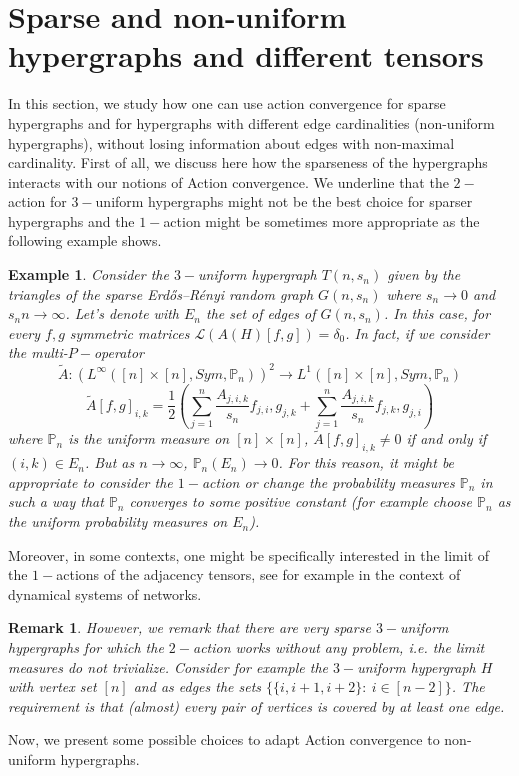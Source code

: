 \documentclass[11pt]{article}
\newtheorem{example}[theorem]{Example}
\newtheorem{remark}[theorem]{Remark}
\begin{document}
\section{Sparse and non-uniform hypergraphs and different tensors}\label{NonUnifHypSect}
In this section, we study how one can use action convergence for sparse hypergraphs and for hypergraphs with different edge cardinalities (non-uniform hypergraphs), without losing information about edges with non-maximal cardinality. %
First of all, we discuss here how the sparseness of the hypergraphs interacts with our notions of Action convergence.
We underline that the $2-$action for $3-$uniform hypergraphs might not be the best choice for sparser hypergraphs and the $1-$action might be sometimes more appropriate as the following example shows.

\begin{example}
Consider the $3-$uniform hypergraph $T(n,s_n)$ given by the triangles of the sparse Erdős–Rényi random graph $G(n,s_n)$ where $s_n \rightarrow 0 $ and $s_n n\rightarrow \infty$. Let's denote with $E_n$ the set of edges of $G(n,s_n)$. In this case, for every $f,g$ symmetric matrices $\mathcal{L}(A(H)[f,g])=\delta_0$.  In fact, if we consider the multi-$P-$operator
$$\widetilde{A}:(L^{\infty}([n]\times [n],Sym,\mathbb{P}_n))^2\longrightarrow L^{1}([n]\times [n],Sym,\mathbb{P}_n)$$
$$\widetilde{A}[f,g]_{i,k}=\frac{1}{2}(\sum^n_{j=1}\frac{A_{j,i,k}}{s_n}f_{j,i},g_{j,k} +\sum^n_{j=1}\frac{A_{j,i,k}}{s_n}f_{j,k},g_{j,i})
$$
where $\mathbb{P}_n$ is the uniform measure on $[n]\times [n]$, $\widetilde{A}[f,g]_{i,k}\neq 0$ if and only if $(i,k)\in E_n$. But as $n\rightarrow \infty$, $\mathbb{P}_n(E_n)\rightarrow 0$. For this reason, it might be appropriate to consider the $1-$action or change the probability measures $\mathbb{P}_n$ in such a way that $\mathbb{P}_n$ converges to some positive constant (for example choose $\mathbb{P}_n$ as the uniform probability measures on $E_n$).
\end{example}

Moreover, in some contexts, one might be specifically interested in the limit of the $1-$actions of the adjacency tensors, see for example \cite{kuehn2023vlasov} in the context of dynamical systems of networks.

\begin{remark}
    However, we remark that there are very sparse $3-$uniform hypergraphs for which the $2-$action works without any problem, i.e. the limit measures do not trivialize. Consider for example the $3-$uniform hypergraph $H$ with vertex set $[n]$ and as edges the sets $\{\{i,i+1,i+2\}: \ i\in [n-2] \}$. The requirement is that (almost) every pair of vertices is covered by at least one edge. 
\end{remark}  
Now, we present some possible choices to adapt Action convergence to non-uniform hypergraphs.
\end{document}

